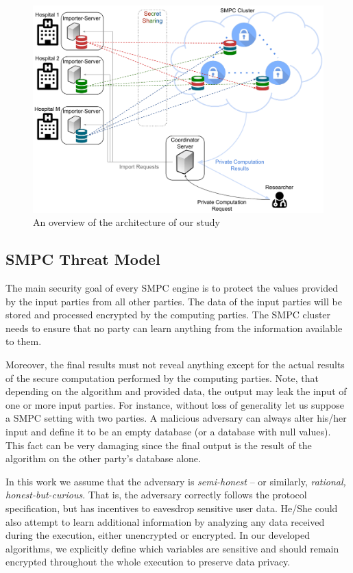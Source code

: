 \begin{figure}[t]
  \centering
  \includegraphics[width=\linewidth]{figures/overview.pdf}
  \caption{An overview of the architecture of our study}\label{f:overview}
\end{figure}



\subsection{SMPC Threat Model}\label{s:smpc-threat-model}
The main security goal of every SMPC engine is to protect the values provided by the input parties from all other parties.
The data of the input parties will be stored and processed encrypted by the computing parties.
The SMPC cluster needs to ensure that no party can learn anything from the information available to them.

Moreover, the final results must not reveal anything except for the actual results of the secure computation performed by the computing parties.
Note, that depending on the algorithm and provided data, the output may leak the input of one or more input parties.
For instance, without loss of generality let us suppose a SMPC setting with two parties.
A malicious adversary can always alter his/her input and define it to be an empty database (or a database with null values).
This fact can be very damaging since the final output is the result of the algorithm on the other party’s database alone.

In this work we assume that the adversary is \emph{semi\hyp honest} -- or similarly, \emph{rational, honest\hyp but\hyp curious}.
That is, the adversary correctly follows the protocol specification, but has incentives to eavesdrop sensitive user data.
He/She could also attempt to learn additional information by analyzing any data received during the execution, either unencrypted or encrypted.
In our developed algorithms, we explicitly define which variables are sensitive and should remain encrypted throughout the whole execution to preserve data privacy.


